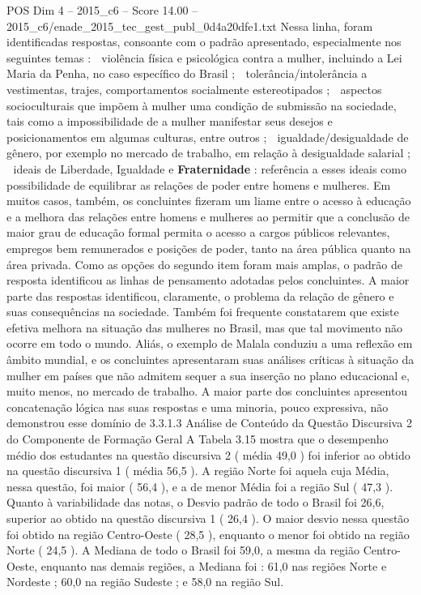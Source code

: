 \begin{textsample}{POS Dim 4 – 2015\_c6 – Score 14.00 – 2015\_c6/enade\_2015\_tec\_gest\_publ\_0d4a20dfe1.txt}
Nessa linha, foram identificadas respostas, consoante com o padrão apresentado, especialmente nos seguintes temas :  violência física e psicológica contra a mulher, incluindo a Lei Maria da Penha, no caso específico do Brasil ;  tolerância/intolerância a vestimentas, trajes, comportamentos socialmente estereotipados ;  aspectos socioculturais que impõem à mulher uma condição de submissão na sociedade, tais como a impossibilidade de a mulher manifestar seus desejos e posicionamentos em algumas culturas, entre outros ;  igualdade/desigualdade de gênero, por exemplo no mercado de trabalho, em relação à desigualdade salarial ;  ideais de Liberdade, Igualdade e \textbf{Fraternidade} : referência a esses ideais como possibilidade de equilibrar as relações de poder entre homens e mulheres.
Em muitos casos, também, os concluintes fizeram um liame entre o acesso à educação e a melhora das relações entre homens e mulheres ao permitir que a conclusão de maior grau de educação formal permita o acesso a cargos públicos relevantes, empregos bem remunerados e posições de poder, tanto na área pública quanto na área privada.
Como as opções do segundo item foram mais amplas, o padrão de resposta identificou as linhas de pensamento adotadas pelos concluintes.
A maior parte das respostas identificou, claramente, o problema da relação de gênero e suas consequências na sociedade.
Também foi frequente constatarem que existe efetiva melhora na situação das mulheres no Brasil, mas que tal movimento não ocorre em todo o mundo.
Aliás, o exemplo de Malala conduziu a uma reflexão em âmbito mundial, e os concluintes apresentaram suas análises críticas à situação da mulher em países que não admitem sequer a sua inserção no plano educacional e, muito menos, no mercado de trabalho.
A maior parte dos concluintes apresentou concatenação lógica nas suas respostas e uma minoria, pouco expressiva, não demonstrou esse domínio de 3.3.1.3 Análise de Conteúdo da Questão Discursiva 2 do Componente de Formação Geral A Tabela 3.15 mostra que o desempenho médio dos estudantes na questão discursiva 2 ( média 49,0 ) foi inferior ao obtido na questão discursiva 1 ( média 56,5 ).
A região Norte foi aquela cuja Média, nessa questão, foi maior ( 56,4 ), e a de menor Média foi a região Sul ( 47,3 ).
Quanto à variabilidade das notas, o Desvio padrão de todo o Brasil foi 26,6, superior ao obtido na questão discursiva 1 ( 26,4 ).
O maior desvio nessa questão foi obtido na região Centro-Oeste ( 28,5 ), enquanto o menor foi obtido na região Norte ( 24,5 ).
A Mediana de todo o Brasil foi 59,0, a mesma da região Centro-Oeste, enquanto nas demais regiões, a Mediana foi : 61,0 nas regiões Norte e Nordeste ; 60,0 na região Sudeste ; e 58,0 na região Sul.

\end{textsample}
